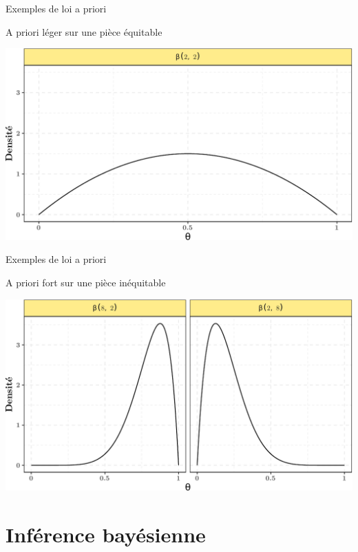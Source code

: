 \documentclass[9pt,ignorenonframetext,]{beamer}
\begin{document}
\begin{frame}{Exemples de loi a priori}
\protect\hypertarget{exemples-de-loi-a-priori-1}{}

A priori léger sur une pièce équitable

\begin{center}\includegraphics{diapos_inference_bayesienne_files/figure-beamer/plot_prior_beta_equil-1} \end{center}

\end{frame}

\begin{frame}{Exemples de loi a priori}
\protect\hypertarget{exemples-de-loi-a-priori-2}{}

A priori fort sur une pièce inéquitable

\begin{center}\includegraphics{diapos_inference_bayesienne_files/figure-beamer/plot_prior_beta_non_equil-1} \end{center}

\end{frame}

\hypertarget{infuxe9rence-bayuxe9sienne-1}{%
\section{Inférence bayésienne}\label{infuxe9rence-bayuxe9sienne-1}}
\end{document}
